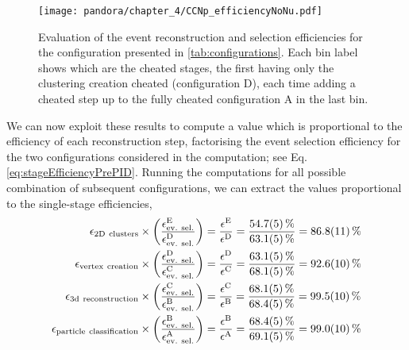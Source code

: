 \begin{figure}
    \centering
    \texttt{[image: pandora/chapter\_4/CCNp\_efficiencyNoNu.pdf]}
    \caption[Evaluation of the reconstruction and selection efficiency for different configurations]{Evaluation of the event reconstruction and selection efficiencies for the configuration presented in \autoref{tab:configurations}. Each bin label shows which are the cheated stages, the first having only the clustering creation cheated (configuration D), each time adding a cheated step up to the fully cheated configuration A in the last bin. }
    \label{fig:efficiencyNoNu}
\end{figure}

We can now exploit these results to compute a value which is proportional to the efficiency of each reconstruction step, factorising the event selection efficiency for the two configurations considered in the computation; see Eq. \eqref{eq:stageEfficiencyPrePID}. Running the computations for all possible combination of subsequent configurations, we can extract the values proportional to the single-stage efficiencies, \begin{align}
    \epsilon_\mathrm{2D\ clusters} \times 
    \qty(\frac{\epsilon_\mathrm{ev.\ sel.}^\mathrm{E}}{\epsilon_\mathrm{ev.\ sel.}^\mathrm{D}}) 
    &= \frac{\epsilon^\mathrm{E}}{\epsilon^\mathrm{D}} = \frac{\SI{54.7(5)}{\percent}}{\SI{63.1(5)}{\percent}} = 
    \SI[round-mode = uncertainty]{86.779059+-1.104354}{\percent} \\
    \epsilon_\mathrm{vertex\ creation} 
    \times \qty(\frac{\epsilon_\mathrm{ev.\ sel.}^\mathrm{D}}{\epsilon_\mathrm{ev.\ sel.}^\mathrm{C}}) 
    &= \frac{\epsilon^\mathrm{D}}{\epsilon^\mathrm{C}} = \frac{\SI{63.1(5)}{\percent}}{\SI{68.1(5)}{\percent}} = 
    \SI[round-mode = uncertainty]{92.575370+-1.024352}{\percent} \\
    \epsilon_\mathrm{3d\ reconstruction} 
    \times \qty(\frac{\epsilon_\mathrm{ev.\ sel.}^\mathrm{C}}{\epsilon_\mathrm{ev.\ sel.}^\mathrm{B}}) 
    &= \frac{\epsilon^\mathrm{C}}{\epsilon^\mathrm{B}} = \frac{\SI{68.1(5)}{\percent}}{\SI{68.4(5)}{\percent}} = 
    \SI[round-mode = uncertainty]{99.526687+-1.041368}{\percent} \\
    \epsilon_\mathrm{particle\ classification} 
    \times \qty(\frac{\epsilon_\mathrm{ev.\ sel.}^\mathrm{B}}{\epsilon_\mathrm{ev.\ sel.}^\mathrm{A}}) 
    &= \frac{\epsilon^\mathrm{B}}{\epsilon^\mathrm{A}} = \frac{\SI{68.4(5)}{\percent}}{\SI{69.1(5)}{\percent}} = 
    \SI[round-mode = uncertainty]{99.039894+-1.024644}{\percent}
\end{align}

